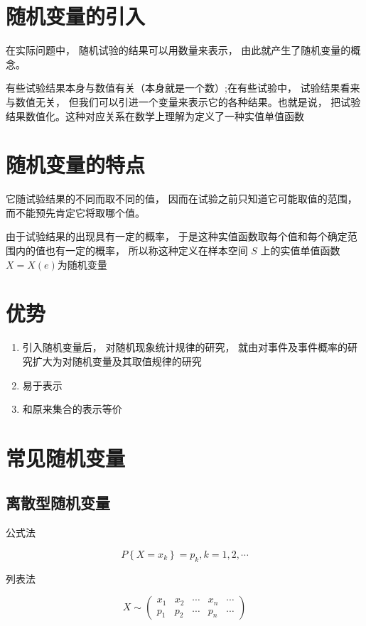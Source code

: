 
\section{随机变量的引入}

在实际问题中， 随机试验的结果可以用数量来表示， 由此就产生了随机变量的概念。

有些试验结果本身与数值有关（本身就是一个数）;在有些试验中， 试验结果看来与数值无关， 但我们可以引进一个变量来表示它的各种结果。也就是说， 把试验结果数值化。这种对应关系在数学上理解为定义了一种实值单值函数

\section{随机变量的特点}

它随试验结果的不同而取不同的值， 因而在试验之前只知道它可能取值的范围， 而不能预先肯定它将取哪个值。

由于试验结果的出现具有一定的概率， 于是这种实值函数取每个值和每个确定范围内的值也有一定的概率， 所以称这种定义在样本空间 $S$ 上的实值单值函数 $X= X(e)$为随机变量

\section{优势}

\begin{enumerate}
    \item 引入随机变量后， 对随机现象统计规律的研究， 就由对事件及事件概率的研究扩大为对随机变量及其取值规律的研究
    \item 易于表示
    \item 和原来集合的表示等价
\end{enumerate}

\section{常见随机变量}

\subsection{离散型随机变量}

公式法

\begin{equation}
{P}\left\{{X}={x}_{k}\right\}={p}_{k}, {k}=1,2, \cdots
\end{equation}

列表法
  
\begin{equation}X \sim\left(\begin{array}{lllll}x_{1} & x_{2} & \cdots & x_{n} & \cdots \\ p_{1} & p_{2} & \cdots & p_{n} & \cdots\end{array}\right)\end{equation}

